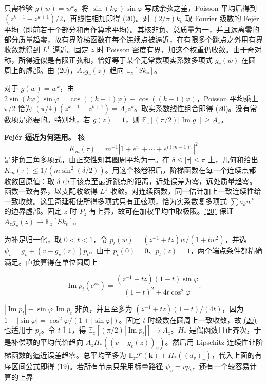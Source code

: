 \documentclass[11pt,a4paper]{article}
\begin{document}
只需检验 \(g(w)=w^k\)。将 \(\sin(k\varphi)\sin\varphi\) 写成余弦之差，Poisson 平均后得到 \((z^{k-1}-z^{k+1})/2\)，再线性相加即得 \hyperref[eq:20]{(20)}。对 \((2/\pi)\widetilde k_v\) 取 Fourier 级数的 Fejér 平均（即前若干个部分和再作算术平均）。其核非负、总质量为一，并且远离零的部分质量趋零，故有界阶梯函数在每个连续点被逼近，在有限多个跳点之外用有界收敛就得到 \(L^1\) 逼近。固定 \(z\) 时 Poisson 密度有界，加这个权重仍收敛。由于奇对称，所得近似是有限正弦和，恰好等于某个无常数项实系数多项式 \(g_v(w)\) 在圆周上的虚部。由 \hyperref[eq:20]{(20)}，\(A_zg_v(z)\) 趋向 \(\mathbb E_z[Sk_v]\)。

对于 \(g(w)=w^k\)，由 \(2\sin(k\varphi)\sin\varphi=\cos((k-1)\varphi)-\cos((k+1)\varphi)\)，Poisson 平均乘上 \(\pi/2\) 恰为 \((\pi/4)(z^{k-1}-z^{k+1})=A_z z^k\)。取实系数线性组合即得 \hyperref[eq:20]{(20)}。没有常数项是必要的。特别地，若 \(g(z)=1\)，则 \(\mathbb E_z[(\pi/2)|\operatorname{Im}g|]\ge A_z\)。

\textbf{Fejér 逼近为何适用。} 核 \[
 K_m(\tau)=m^{-1}|1+e^{i\tau}+\cdots+e^{i(m-1)\tau}|^2
\] 是非负三角多项式，由正交性知其圆周平均为一。在 \(\delta\le|\tau|\le\pi\) 上，几何和给出 \(K_m(\tau)\le1/(m\sin^2(\delta/2))\)。用这个核卷积后，阶梯函数在每一个连续点都收敛回原值：取 \(\delta\) 小于该点至最近跳点的距离，近处误差为零，远处质量趋零。函数一致有界，以支配收敛得 \(L^1\) 收敛。对连续函数，同一估计加上一致连续性给一致收敛。这里奇延拓使所得多项式只有正弦项，恰为实系数复多项式 \(\sum a_kw^k\) 的边界虚部。固定 \(z\) 时 \(P_z\) 有上界，故可在加权平均中取极限。\hyperref[eq:20]{(20)} 保证 \(A_zg_v(z)\to\mathbb E_z[Sk_v]\)。

为补足归一化，取 \(0<t<1\)，令 \(p_t(w)=(z^{-1}+tz)w/(1+tw^2)\)，并选 \(\psi_v=g_v+(v-g_v(z))p_t\)。由于 \(p_t(0)=0\)、\(p_t(z)=1\)，两个端点条件都精确满足。直接算得在单位圆周上

\[
 \operatorname{Im}p_t(e^{i\varphi})
 =\frac{(z^{-1}+tz)(1-t)\sin\varphi}{(1-t)^2+4t\cos^2\varphi}.
\]

\(|\operatorname{Im}p_t|-\sin\varphi\,\operatorname{Im}p_t\) 非负，并且至多为 \((z^{-1}+tz)(1-t)/(4t)\)，因为 \(1-|\sin\varphi|=\cos^2\varphi/(1+|\sin\varphi|)\)。固定 \(t\) 时级数在圆周上一致收敛，故 \hyperref[eq:20]{(20)} 也适用于 \(p_t\)。令 \(t\uparrow1\)，得 \(\mathbb E_z[(\pi/2)|\operatorname{Im}p_t|]\to A_z\)。\(H_*\) 是偶函数且正齐次，于是补偿项的平均代价趋向 \(A_zH_*((v-g_v(z))_v)\)。然后用 Lipschitz 连续性让阶梯函数的逼近误差趋零。总平均至多为 \(\mathbb E_z\mathcal F(\mathbf k)+H_*((d_v)_v)\)，代入上面的有序区间公式即得 \hyperref[eq:19]{(19)}。若所有节点只采用标量路径 \(\psi_v=vp_t\)，还有一个较容易计算的上界
\end{document}
